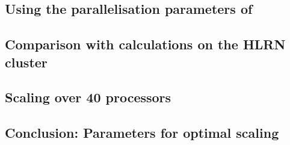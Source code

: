 \documentclass[main.tex]{subfiles}
\begin{document}
\subsection{Using the parallelisation parameters of \QE}

\subsection{Comparison with calculations on the HLRN cluster}

\subsection{Scaling over 40 processors}

\subsection{Conclusion: Parameters for optimal scaling}
\end{document}

